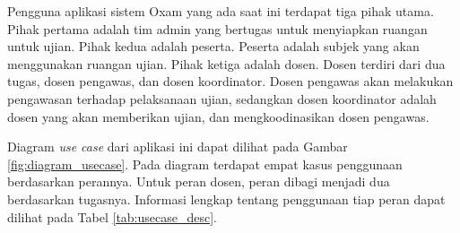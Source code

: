 Pengguna aplikasi sistem Oxam yang ada saat ini terdapat tiga pihak utama.
Pihak pertama adalah tim admin yang bertugas untuk menyiapkan ruangan
untuk ujian. Pihak kedua adalah peserta. Peserta adalah subjek yang akan
menggunakan ruangan ujian. Pihak ketiga adalah dosen. Dosen terdiri dari
dua tugas, dosen pengawas, dan dosen koordinator. Dosen pengawas akan melakukan
pengawasan terhadap pelaksanaan ujian, sedangkan dosen koordinator adalah
dosen yang akan memberikan ujian, dan mengkoodinasikan dosen pengawas.

Diagram \textit{use case} dari aplikasi ini dapat dilihat pada Gambar 
\ref{fig:diagram_usecase}. Pada diagram terdapat empat kasus penggunaan berdasarkan
perannya. Untuk peran dosen, peran dibagi menjadi dua berdasarkan tugasnya. 
Informasi lengkap tentang penggunaan tiap peran dapat dilihat pada Tabel \ref{tab:usecase_desc}.

